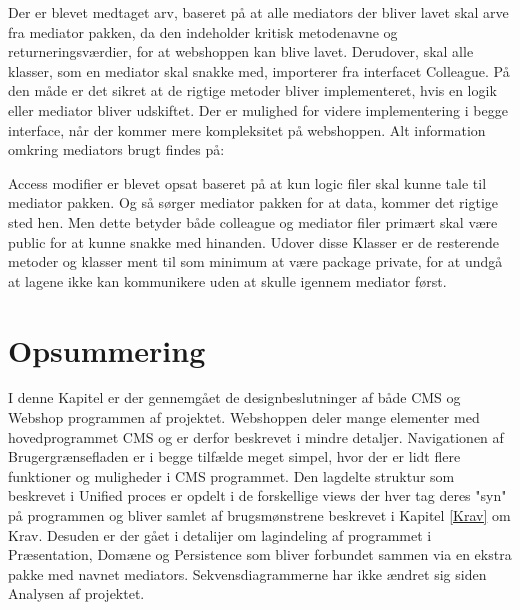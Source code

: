 \FloatBarrier

Der er blevet medtaget arv, baseret på at alle mediators der bliver lavet skal arve fra mediator pakken, da den indeholder kritisk metodenavne og returneringsværdier, for at webshoppen kan blive lavet. Derudover, skal alle klasser, som en mediator skal snakke med, importerer fra interfacet Colleague. På den måde er det sikret at de rigtige metoder bliver implementeret, hvis en logik eller mediator bliver udskiftet. Der er mulighed for videre implementering i begge interface, når der kommer mere kompleksitet på webshoppen. Alt information omkring mediators brugt findes på: \cite{mediator}
 
Access modifier er blevet opsat baseret på at kun logic filer skal kunne tale til mediator pakken. Og så  sørger mediator pakken for at data, kommer det rigtige sted hen. Men dette betyder både colleague og mediator filer primært skal være public for at kunne snakke med hinanden. Udover disse Klasser er de resterende metoder og klasser ment til som minimum at være package private, for at undgå at lagene ikke kan kommunikere uden at skulle igennem mediator først.

\section{Opsummering}
I  denne Kapitel  er der gennemgået de designbeslutninger af både CMS og Webshop programmen af projektet.  Webshoppen deler mange elementer med hovedprogrammet CMS og er derfor beskrevet i mindre detaljer. Navigationen af Brugergrænsefladen er i begge tilfælde meget simpel, hvor der er lidt flere funktioner og muligheder i CMS programmet. Den lagdelte struktur som beskrevet i Unified proces  er opdelt i de forskellige views der hver tag deres "syn" på programmen og bliver samlet af brugsmønstrene beskrevet i  Kapitel \ref{Krav} om Krav. Desuden er der gået i detalijer om lagindeling af programmet i Præsentation, Domæne og Persistence som bliver forbundet sammen via en ekstra pakke med navnet mediators. Sekvensdiagrammerne har ikke ændret sig siden Analysen af projektet.
